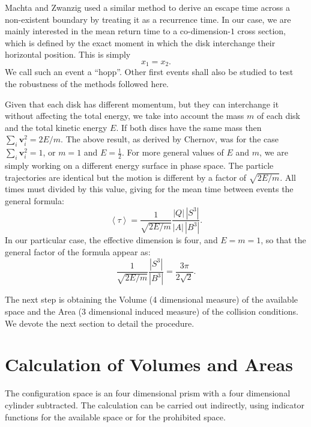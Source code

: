 \documentclass[letterpaper,10pt, jcp, aps]{revtex4-1}
\newcommand{\mean}[1]{\left \langle #1 \right \rangle}
\newcommand{\vv}{\mathbf{v}}
\begin{document}
Machta and Zwanzig \cite{MachtaZwan} used a similar method to derive an escape 
time across a non-existent boundary by treating it as a recurrence time.
In our case, we are mainly interested in the mean return time to 
a co-dimension-$1$ cross section, 
which is defined by the exact moment
in which the disk interchange their horizontal position. This is simply
\begin{equation} \label{condchoque}
x_1 = x_2.
\end{equation}
We call such an event a ``hopp''. Other first events shall also be studied
to test the robustness of the methods followed here.

Given that each disk has different momentum, but
they can interchange it without affecting the
total energy, we take into account the mass $m$ of each disk 
and the total kinetic energy $E$.
If both discs have the same mass then $\sum_i \vv_i^2 = 2E / m$.
The above result, as derived by Chernov, 
was for the case $\sum_i \vv_i^2 = 1$, or $m=1$ and $E=\frac{1}{2}$.  
For more general values of $E$ and $m$, 
we are simply working on a different energy surface in phase space. 
The particle trajectories are identical but the motion is different
by a factor of
$\sqrt{2E/m}$. All times must divided by this value, 
giving for
the mean time between events the general formula:
\begin{equation} \label{meantimegeneral}
  \mean{\tau} =  \frac{1}{\sqrt{2E / m}} 
\frac{|Q| \, |S^3|} {|A| \, |B^3|}.	
\end{equation}
In our particular case, the effective dimension is four,
and $E=m=1$, so that the general factor of the formula appear as:
\begin{equation} \label{meantimegeneralredux}
   \frac{1}{\sqrt{2E / m}} 
\frac{|S^3|}{|B^3|}=\frac{3\pi}{2\sqrt{2}}.	 
\end{equation}

The next step is obtaining the Volume (4 dimensional measure) of
the available space and the Area (3 dimensional induced measure) of
the collision conditions. We devote the next section to
detail the procedure.


\section{Calculation of Volumes and Areas}

The configuration
space is an four dimensional prism with a four dimensional
cylinder subtracted.
The calculation can be carried out indirectly,
 using indicator functions for the
available space or for the prohibited space.
\end{document}
